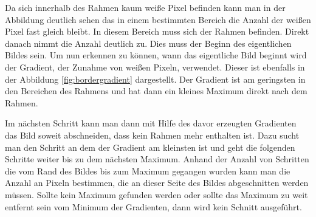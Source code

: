 Da sich innerhalb des Rahmen kaum weiße Pixel befinden kann man in der Abbildung deutlich sehen das in einem bestimmten Bereich die Anzahl der weißen Pixel fast gleich bleibt. In diesem Bereich muss sich der Rahmen befinden. Direkt danach nimmt die Anzahl deutlich zu. Dies muss der Beginn des eigentlichen Bildes sein. 
Um nun erkennen zu können, wann das eigentliche Bild beginnt wird der Gradient, der Zunahme von weißen Pixeln, verwendet. Dieser ist ebenfalls in der Abbildung \ref{fig:bordergradient} dargestellt. 
Der Gradient ist am geringsten in den Bereichen des Rahmens und hat dann ein kleines Maximum direkt nach dem Rahmen. 

Im nächsten Schritt kann man dann mit Hilfe des davor erzeugten Gradienten das Bild soweit abschneiden, dass kein Rahmen mehr enthalten ist. Dazu sucht man den Schritt an dem der Gradient am kleinsten ist und geht die folgenden Schritte weiter bis zu dem nächsten Maximum. Anhand der Anzahl von Schritten die vom Rand des Bildes bis zum Maximum gegangen wurden kann man die Anzahl an Pixeln bestimmen, die an dieser Seite des Bildes abgeschnitten werden müssen. Sollte kein Maximum gefunden werden oder sollte das Maximum zu weit entfernt sein vom Minimum der Gradienten, dann wird kein Schnitt ausgeführt.